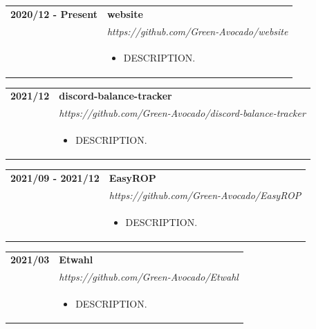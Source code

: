 \documentclass[letterpaper]{article}
\begin{document}
        \begin{tabular}{p{} p{}} 
            \textbf{2020/12 - Present} & \textbf{website} \\
            & \emph{https://github.com/Green-Avocado/website} \\
            & \begin{itemize}
                \item DESCRIPTION.
            \end{itemize}
            \\
        \end{tabular}

        \begin{tabular}{p{} p{}} 
            \textbf{2021/12} & \textbf{discord-balance-tracker} \\
            & \emph{https://github.com/Green-Avocado/discord-balance-tracker} \\
            & \begin{itemize}
                \item DESCRIPTION.
            \end{itemize}
            \\
        \end{tabular}

        \begin{tabular}{p{} p{}} 
            \textbf{2021/09 - 2021/12} & \textbf{EasyROP} \\
            & \emph{https://github.com/Green-Avocado/EasyROP} \\
            & \begin{itemize}
                \item DESCRIPTION.
            \end{itemize}
            \\
        \end{tabular}

        \begin{tabular}{p{} p{}} 
            \textbf{2021/03} & \textbf{Etwahl} \\
            & \emph{https://github.com/Green-Avocado/Etwahl} \\
            & \begin{itemize}
                \item DESCRIPTION.
            \end{itemize}
            \\
        \end{tabular}
\end{document}
